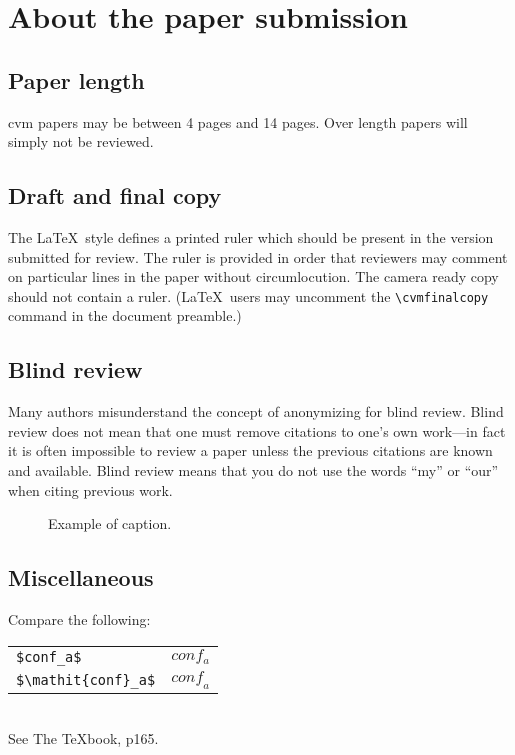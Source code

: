 \documentclass[10pt,twocolumn,letterpaper]{article}
\begin{document}
\section{About the paper submission}

\subsection{Paper length}
cvm papers may be between 4 pages and 14 pages. Over length papers will simply not be reviewed.

\subsection{Draft and final copy}
The \LaTeX\ style defines a printed ruler which should be present in the
version submitted for review.  The ruler is provided in order that
reviewers may comment on particular lines in the paper without
circumlocution. The camera ready copy should not contain a ruler.
(\LaTeX\ users may uncomment the \verb'\cvmfinalcopy' command in the document preamble.)

\subsection{Blind review}
Many authors misunderstand the concept of anonymizing for blind
review.  Blind review does not mean that one must remove
citations to one's own work---in fact it is often impossible to
review a paper unless the previous citations are known and
available.
Blind review means that you do not use the words ``my'' or ``our''
when citing previous work.

\begin{figure}[t]
\begin{center}
\fbox{\rule{0pt}{2in} \rule{0.9\linewidth}{0pt}}
\end{center}
   \caption{Example of caption.  }
\label{fig:long}
\label{fig:onecol}
\end{figure}

\subsection{Miscellaneous}

\noindent
Compare the following:\\
\begin{tabular}{ll}
 \verb'$conf_a$' &  $conf_a$ \\
 \verb'$\mathit{conf}_a$' & $\mathit{conf}_a$
\end{tabular}\\
See The \TeX book, p165.
\end{document}
